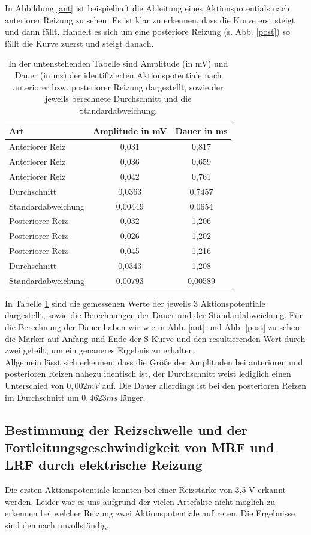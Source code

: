 \documentclass[11pt]{article}
\begin{document}
In Abbildung \ref{ant} ist beispielhaft die Ableitung eines Aktionspotentials nach anteriorer Reizung zu sehen. Es ist klar zu erkennen, dass die Kurve erst steigt und dann fällt. Handelt es sich um eine posteriore Reizung (s. Abb. \ref{post}) so fällt die Kurve zuerst und steigt danach.

\begin{table}[H]
\caption{In der untenstehenden Tabelle sind Amplitude (in mV) und Dauer (in ms) der identifizierten Aktionspotentiale nach anteriorer bzw. posteriorer Reizung dargestellt, sowie der jeweils berechnete Durchschnitt und die Standardabweichung.}
\begin{center}
\begin{tabular}{l||c|c}
Art & Amplitude in mV & Dauer in ms \\
\hline\hline
Anteriorer Reiz & 0,031 & 0,817\\
Anteriorer Reiz & 0,036 & 0,659\\
Anteriorer Reiz & 0,042 & 0,761\\
\hline
Durchschnitt & 0,0363& 0,7457\\
Standardabweichung & 0,00449 &0,0654 \\
\hline\hline
Posteriorer Reiz & 0,032 & 1,206\\
Posteriorer Reiz & 0,026& 1,202\\
Posteriorer Reiz & 0,045 & 1,216\\
\hline
Durchschnitt & 0,0343 & 1,208\\
Standardabweichung & 0,00793& 0,00589
\end{tabular}
\end{center}
\label{werte}
\end{table}

In Tabelle \ref{werte} sind die gemessenen Werte der jeweils 3 Aktionspotentiale dargestellt, sowie die Berechnungen der Dauer und der Standardabweichung. Für die Berechnung der Dauer haben wir wie in Abb. \ref{ant} und Abb. \ref{post} zu sehen die Marker auf Anfang und Ende der S-Kurve und den resultierenden Wert durch zwei geteilt, um ein genaueres Ergebnis zu erhalten.\\
Allgemein lässt sich erkennen, dass die Größe der Amplituden bei anterioren und posterioren Reizen nahezu identisch ist, der Durchschnitt weist lediglich einen Unterschied von $0,002 mV$ auf. Die Dauer allerdings ist bei den posterioren Reizen im Durchschnitt um $0,4623 ms$ länger.


\subsection{Bestimmung der Reizschwelle und der Fortleitungsgeschwindigkeit von MRF und LRF durch elektrische Reizung}
Die ersten Aktionspotentiale konnten bei einer Reizstärke von 3,5 V erkannt werden. Leider war es uns aufgrund der vielen Artefakte nicht möglich zu erkennen bei welcher Reizung zwei Aktionspotentiale auftreten. Die Ergebnisse sind demnach unvollständig. 
\end{document}
